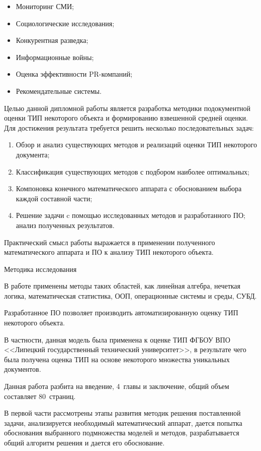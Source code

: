 \documentclass[a4paper,14pt,russian]{extreport}
\begin{document}
\begin{itemize}
\item Мониторинг СМИ;
\item Социологические исследования;
\item Конкурентная разведка;
\item Информационные войны;
\item Оценка эффективности PR-компаний;
\item Рекомендательные системы.
\end{itemize}

Целью данной дипломной работы является разработка методики подокументной оценки \mbox{ТИП} некоторого объекта  и формированию взвешенной средней оценки. Для достижения результата требуется решить несколько последовательных задач:

\begin{enumerate}
\item Обзор и анализ существующих методов и реализаций оценки \mbox{ТИП} некоторого документа;
\item Классификация существующих методов с подбором наиболее оптимальных;
\item Компоновка конечного математического аппарата с обоснованием выбора каждой составной части;
\item Решение задачи c помощью исследованных методов и разработанного \mbox{ПО}; анализ полученных результатов.
\end{enumerate}

Практический смысл работы выражается в применении полученного математического аппарата и \mbox{ПО} к анализу ТИП некоторого объекта.

Методика исследования

В работе применены методы таких областей, как линейная алгебра, нечеткая логика, математическая статистика, \mbox{ООП}, операционные системы и среды, \mbox{СУБД}.

Разработанное ПО позволяет производить автоматизированную оценку \mbox{ТИП} некоторого объекта.

В частности, данная модель была применена к оценке \mbox{ТИП} \mbox{ФГБОУ} \mbox{ВПО} <<Липецкий государственный технический университет>>, в результате чего была получена оценка \mbox{ТИП} на основе некоторого множества уникальных документов.

Данная работа разбита на введение, 4~главы и заключение, общий объем составляет 80~страниц.

В первой части рассмотрены этапы развития методик решения поставленной задачи, анализируется необходимый математический аппарат, дается попытка обоснования выбранного подмножества моделей и методов, разрабатывается общий алгоритм решения и дается его обоснование.
\end{document}
